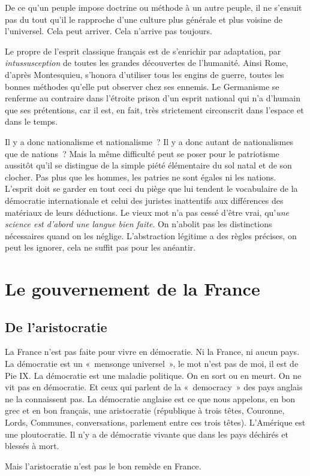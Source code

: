 \documentclass[french,twoside]{book} %
\newcommand{\astermono}{\medskip\centerline{\color{rubric}\large\selectfont{\syms ✻}}\medskip\par}%
\begin{document}
\astermono

\noindent De ce qu’un peuple impose doctrine ou méthode à un autre peuple, il ne s’ensuit pas du tout qu’il le rapproche d’une culture plus générale et plus voisine de l’universel. Cela peut arriver. Cela n’arrive pas toujours.\par

\astermono

\noindent Le propre de l’esprit classique français est de s’enrichir par adaptation, par \emph{intussusception} de toutes les grandes découvertes de l’humanité. Ainsi Rome, d’après Montesquieu, s’honora d’utiliser tous les engins de guerre, toutes les bonnes méthodes qu’elle put observer chez ses ennemis. Le Germanisme se renferme au contraire dans l’étroite prison d’un esprit national qui n’a d’humain que ses prétentions, car il est, en fait, très strictement circonscrit dans l’espace et dans le temps.\par
Il y a donc nationalisme et nationalisme ? Il y a donc autant de nationalismes que de nations ? Mais la même difficulté peut se poser pour le patriotisme aussitôt qu’il se distingue de la simple piété élémentaire du sol natal et de son clocher. Pas plus que les hommes, les patries ne sont égales ni les nations. L’esprit doit se garder en tout ceci du piège que lui tendent le vocabulaire de la démocratie internationale et celui des juristes inattentifs aux différences des matériaux de leurs déductions. Le vieux mot n’a pas cessé d’être vrai, qu’\emph{une science est d’abord une langue bien faite}. On n’abolit pas les distinctions nécessaires quand on les néglige. L’abstraction légitime a des règles précises, on peut les ignorer, cela ne suffit pas pour les anéantir.
\section[{Le gouvernement de la France}]{Le gouvernement de la France}
\subsection[{De l’aristocratie}]{De l’aristocratie}
\noindent La France n’est pas faite pour vivre en démocratie. Ni la France, ni aucun pays. La démocratie est un « mensonge universel », le mot n’est pas de moi, il est de Pie IX. La démocratie est une maladie politique. On en sort ou en meurt. On ne vit pas en démocratie. Et ceux qui parlent de la « democracy » des pays anglais ne la connaissent pas. La démocratie anglaise est ce que nous appelons, en bon grec et en bon français, une aristocratie (république à trois têtes, Couronne, Lords, Communes, conversations, parlement entre ces trois têtes). L’Amérique est une ploutocratie. Il n’y a de démocratie vivante que dans les pays déchirés et blessés à mort.\par
Mais l’aristocratie n’est pas le bon remède en France.\par
\end{document}
